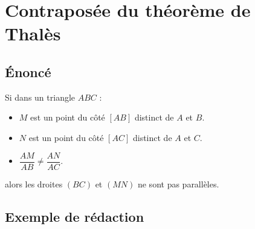 \section{Contraposée du théorème de Thalès}
    \subsection{Énoncé}
        \begin{theoreme}[\admis]
            Si dans un triangle $ABC$ :
            \begin{itemize}
                \item $M$ est un point du côté $[AB]$ distinct de $A$ et $B$.
                \item $N$ est un point du côté $[AC]$ distinct de $A$ et $C$.
                \item $\dfrac{AM}{AB} \neq \dfrac{AN}{AC}$.       
            \end{itemize}
            \medskip
            alors les droites $(BC)$ et $(MN)$ ne sont pas parallèles.
        \end{theoreme}

    \subsection{Exemple de rédaction}


